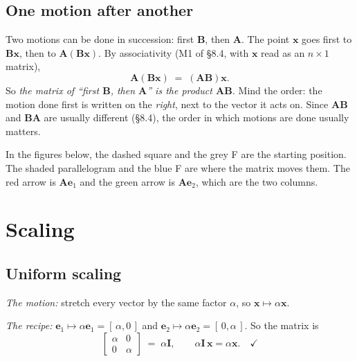 \documentclass[11pt]{article}
\theoremstyle{plain}
\theoremstyle{definition}
\theoremstyle{remark}
\newcommand{\vc}[1]{\mathbf{#1}}
\newcommand{\mt}[1]{\mathbf{#1}}
\begin{document}
\subsection{One motion after another}
Two motions can be done in succession: first $\mt{B}$, then $\mt{A}$. The point
$\vc{x}$ goes first to $\mt{B}\vc{x}$, then to $\mt{A}(\mt{B}\vc{x})$. By
associativity (M1 of \S8.4, with $\vc{x}$ read as an $n\times1$ matrix),
\[
  \mt{A}(\mt{B}\vc{x}) \;=\; (\mt{A}\mt{B})\vc{x} .
\]
So \emph{the matrix of ``first $\mt{B}$, then $\mt{A}$'' is the product
$\mt{A}\mt{B}$.} Mind the order: the motion done first is written on the
\emph{right}, next to the vector it acts on. Since $\mt{A}\mt{B}$ and
$\mt{B}\mt{A}$ are usually different (\S8.4), the order in which motions are
done usually matters.

\noindent In the figures below, the dashed square and the grey F are the
starting position. The shaded parallelogram and the blue F are where the
matrix moves them. The red arrow is $\mt{A}\vc{e}_1$ and the green arrow is
$\mt{A}\vc{e}_2$, which are the two columns.

\section{Scaling}

\subsection{Uniform scaling}
\emph{The motion:} stretch every vector by the same factor $\alpha$, so
$\vc{x}\mapsto\alpha\vc{x}$.

\emph{The recipe:} $\vc{e}_1\mapsto\alpha\vc{e}_1=[\,\alpha,0\,]$ and
$\vc{e}_2\mapsto\alpha\vc{e}_2=[\,0,\alpha\,]$. So the matrix is
\[
  \begin{bmatrix}\alpha&0\\0&\alpha\end{bmatrix} \;=\; \alpha\mt{I},
  \qquad
  \alpha\mt{I}\,\vc{x}=\alpha\vc{x}. \quad\checkmark
\]
\end{document}
